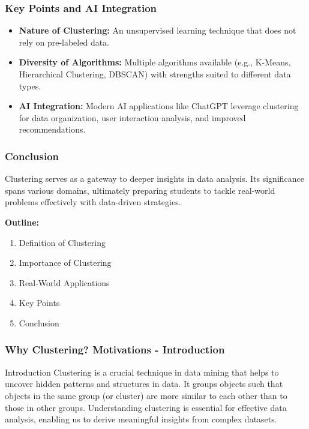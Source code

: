 \documentclass[aspectratio=169]{beamer}
\begin{document}
\begin{frame}[fragile]
    \frametitle{Key Points and AI Integration}
    \begin{itemize}
        \item \textbf{Nature of Clustering:} An unsupervised learning technique that does not rely on pre-labeled data.
        \item \textbf{Diversity of Algorithms:} Multiple algorithms available (e.g., K-Means, Hierarchical Clustering, DBSCAN) with strengths suited to different data types.
        \item \textbf{AI Integration:} Modern AI applications like ChatGPT leverage clustering for data organization, user interaction analysis, and improved recommendations.
    \end{itemize}
\end{frame}

\begin{frame}[fragile]
    \frametitle{Conclusion}
    Clustering serves as a gateway to deeper insights in data analysis. Its significance spans various domains, ultimately preparing students to tackle real-world problems effectively with data-driven strategies.
    
    \textbf{Outline:}
    \begin{enumerate}
        \item Definition of Clustering  
        \item Importance of Clustering  
        \item Real-World Applications  
        \item Key Points  
        \item Conclusion  
    \end{enumerate}
\end{frame}

\begin{frame}[fragile]
    \frametitle{Why Clustering? Motivations - Introduction}
    \begin{block}{Introduction}
        Clustering is a crucial technique in data mining that helps to uncover hidden patterns and structures in data. 
        It groups objects such that objects in the same group (or cluster) are more similar to each other than to those in other groups. 
        Understanding clustering is essential for effective data analysis, enabling us to derive meaningful insights from complex datasets.
    \end{block}
\end{frame}
\end{document}
